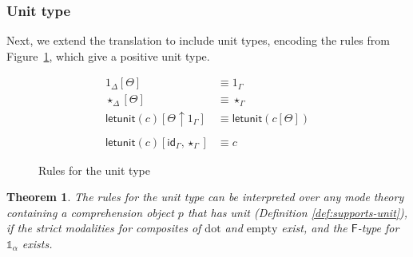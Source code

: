 \documentclass[10pt]{article}
\newtheorem{theorem}{Theorem}
\theoremstyle{definition}
\newcommand{\TYPE}{\,\,\mathsf{Type}}
\newcommand{\id}{\mathsf{id}}
\newcommand{\sdot}{\ensuremath{\mathrm{dot}}}
\newcommand{\sempty}{\ensuremath{\mathrm{empty}}}
\newcommand{\qyields}{\Vdash}
\newcommand\One{\ensuremath{\mathds{1}}}
\newcommand\qunitmatch[1]{\ensuremath{\mathsf{letunit}(#1)}}
\begin{document}
\subsubsection{Unit type}
Next, we extend the translation to include unit types, encoding the
rules from Figure~\ref{fig:qit-unit-rules}, which give a positive unit
type.  

\begin{figure}
\begin{align}
1_\Delta[\Theta] &\equiv 1_\Gamma \\
\star_\Delta[\Theta] &\equiv \star_\Gamma \\ 
\qunitmatch{c}[\Theta \uparrow 1_\Gamma] &\equiv \qunitmatch{c[\Theta]} \\
\nonumber \\
\qunitmatch{c}[\id_\Gamma, \star_\Gamma] &\equiv c
\end{align}
\caption{Rules for the unit type}\label{fig:qit-unit-rules}
\end{figure}

\begin{theorem}
The rules for the unit type can be interpreted over any mode theory
containing a comprehension object $p$ that has unit (Definition \ref{def:supports-unit}), if
the strict modalities for composites of $\sdot$ and $\sempty$ exist, and
the $\mathsf{F}$-type for $\One_\alpha$ exists.
\end{theorem}
\end{document}
